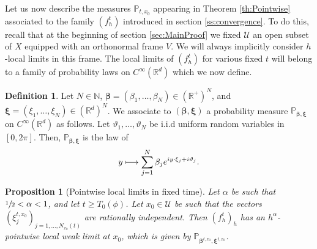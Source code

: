 \documentclass[JEP,XML,SOM,Unicode,published]{cedram}
\let\mathcal\mathscr
\newcommand\mto{\mathchoice{\longmapsto}{\mapsto}{\mapsto}{\mapsto}}
\theoremstyle{plain}
\newtheorem{proposition}[theorem]{Proposition}
\theoremstyle{definition}
\newtheorem{definition}[theorem]{Definition}
\newcommand{\N}{\mathbb{N}}
\newcommand{\R}{\mathbb{R}}
\def\calU{\mathcal{U}}
\begin{document}
Let us now describe the measures $\mathbb{P}_{t,x_0}$ appearing in Theorem \ref{th:Pointwise} associated to the family $(f_h^t)$ introduced in section \ref{ss:convergence}. To do this, recall that at the beginning of section \ref{sec:MainProof} we fixed $\calU$ an open subset of $X$ equipped with an orthonormal frame $V$. We will always implicitly consider $h$-local limits in this frame. The local limits of $(f_h^t)$ for various fixed $t$ will belong to a family of probability laws on $C^\infty(\R^d)$ which we now define.\enlargethispage{.5\baselineskip}%

\begin{definition}\label{def:rpws}
Let $N\in \N$, $\boldsymbol{\beta}= (\beta_1,\dots,\beta_N)\in \left(\R^+\right)^N$, and $\boldsymbol{\xi} =(\xi_1,\dots, \xi_N) \in \left(\R^d\right)^N$. We associate to $(\boldsymbol{\beta}, \boldsymbol{\xi})$ a probability measure $\mathbb{P}_{\boldsymbol{\beta},\boldsymbol{\xi}}$ on $C^\infty(\R^d)$ as follows. Let $\vartheta_1,\dots,\vartheta_N$ be i.i.d uniform random variables in $[0,2\pi]$. Then, $\mathbb{P}_{\boldsymbol{\beta},\boldsymbol{\xi}}$ is the law of\vspace*{-3pt}
\[
y\mto\sum_{j=1}^N\beta_je^{iy\cdot\xi_j+i\vartheta_j}.
\]
\end{definition}

\begin{proposition}[Pointwise local limits in fixed time]\label{prop:LWSumLag}
Let $\alpha$ be such that \hbox{$\sfrac{1}{2}<\alpha<1$}, and let $t\geq T_0(\phi)$. Let $x_0\in\calU$ be such that the vectors $(\xi_j^{t,x_0})_{j=1,\dots,N_{x_0}(t)}$ are rationally independent. Then $(f_h^t)_h$ has an $h^\alpha$-pointwise local weak limit at $x_0$, which is given by $\mathbb{P}_{\boldsymbol{\beta}^{t,x_0}, \boldsymbol{\xi}^{t,x_0}}$.
\end{proposition}
\end{document}
